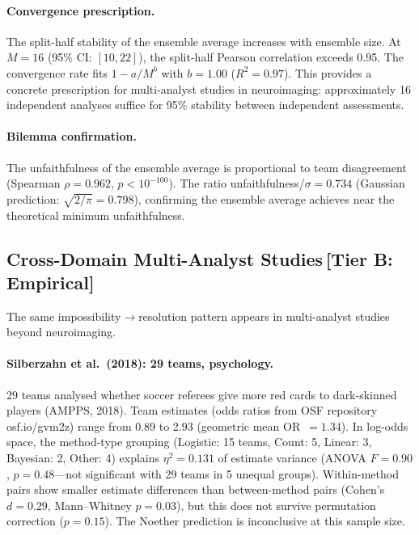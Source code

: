\documentclass[11pt,a4paper]{article}
\begin{document}
\paragraph{Convergence prescription.}
The split-half stability of the ensemble average increases with ensemble size.  At $M = 16$ (95\% CI: $[10, 22]$), the split-half Pearson correlation exceeds 0.95.  The convergence rate fits $1 - a/M^b$ with $b = 1.00$ ($R^2 = 0.97$).  This provides a concrete prescription for multi-analyst studies in neuroimaging: approximately 16 independent analyses suffice for 95\% stability between independent assessments.

\paragraph{Bilemma confirmation.}
The unfaithfulness of the ensemble average is proportional to team disagreement (Spearman $\rho = 0.962$, $p < 10^{-100}$).  The ratio unfaithfulness/$\sigma = 0.734$ (Gaussian prediction: $\sqrt{2/\pi} = 0.798$), confirming the ensemble average achieves near the theoretical minimum unfaithfulness.

\subsection{Cross-Domain Multi-Analyst Studies\,\textnormal{\normalsize[Tier B: Empirical]}}
\label{sec:multi-analyst-cross-domain}

The same impossibility$\to$resolution pattern appears in multi-analyst studies beyond neuroimaging.

\paragraph{Silberzahn et al.\ (2018): 29 teams, psychology.}
29 teams analysed whether soccer referees give more red cards to dark-skinned players (AMPPS, 2018).  Team estimates (odds ratios from OSF repository osf.io/gvm2z) range from 0.89 to 2.93 (geometric mean OR~$= 1.34$).  In log-odds space, the method-type grouping (Logistic: 15 teams, Count: 5, Linear: 3, Bayesian: 2, Other: 4) explains $\eta^2 = 0.131$ of estimate variance (ANOVA $F = 0.90$, $p = 0.48$---not significant with 29 teams in 5 unequal groups).  Within-method pairs show smaller estimate differences than between-method pairs (Cohen's $d = 0.29$, Mann--Whitney $p = 0.03$), but this does not survive permutation correction ($p = 0.15$).  The Noether prediction is inconclusive at this sample size.
\end{document}
